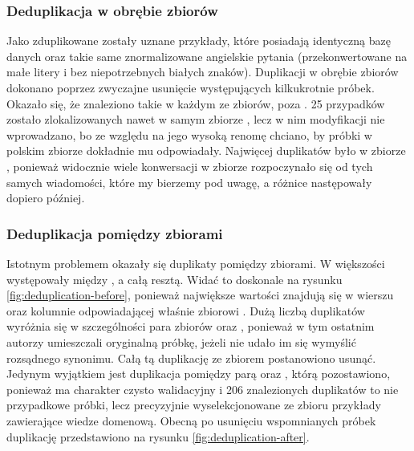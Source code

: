 \subsubsection{Deduplikacja w obrębie zbiorów}
Jako zduplikowane zostały uznane przykłady, które posiadają identyczną bazę danych oraz takie same znormalizowane angielskie pytania (przekonwertowane na małe litery i bez niepotrzebnych białych znaków). Duplikacji w obrębie zbiorów dokonano poprzez zwyczajne usunięcie występujących kilkukrotnie próbek. Okazało się, że znaleziono takie w każdym ze zbiorów, poza . 25 przypadków zostało zlokalizowanych nawet w samym zbiorze , lecz w nim modyfikacji nie wprowadzano, bo ze względu na jego wysoką renomę chciano, by próbki w polskim zbiorze dokładnie mu odpowiadały. Najwięcej duplikatów było w zbiorze , ponieważ widocznie wiele konwersacji w zbiorze  rozpoczynało się od tych samych wiadomości, które my bierzemy pod uwagę, a różnice następowały dopiero później.

\subsubsection{Deduplikacja pomiędzy zbiorami}
Istotnym problemem okazały się duplikaty pomiędzy zbiorami. W większości występowały między , a całą resztą. Widać to doskonale na rysunku \ref{fig:deduplication-before}, ponieważ największe wartości znajdują się w wierszu oraz kolumnie odpowiadającej właśnie zbiorowi . Dużą liczbą duplikatów wyróżnia się w szczególności para zbiorów  oraz , ponieważ w tym ostatnim autorzy umieszczali oryginalną próbkę, jeżeli nie udało im się wymyślić rozsądnego synonimu. Całą tą duplikację ze zbiorem  postanowiono usunąć. Jedynym wyjątkiem jest duplikacja pomiędzy parą  oraz , którą pozostawiono, ponieważ  ma charakter czysto walidacyjny i 206 znalezionych duplikatów to nie przypadkowe próbki, lecz precyzyjnie wyselekcjonowane ze zbioru  przykłady zawierające wiedze domenową. Obecną po usunięciu wspomnianych próbek duplikację przedstawiono na rysunku \ref{fig:deduplication-after}.

